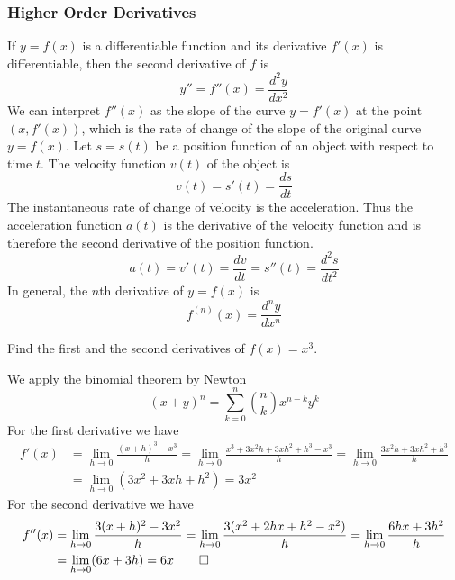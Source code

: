 \subsubsection{Higher Order Derivatives}
 If \(y=f(x)\) is a differentiable function and its derivative \(f'(x)\) is
 differentiable, then the second derivative of \(f\) is
\[y''=f''(x)=\frac{d^2y}{dx^2}\]
We can interpret \(f''(x)\) as the slope of the curve \(y=f'(x)\) at the point
\((x,f'(x))\), which is the rate of change of the slope of the original curve
\(y=f(x)\).
Let \(s=s(t)\) be a position function of an object with respect to time \(t\).
The velocity function \(v(t)\) of the object is \[v(t)=s'(t)=\frac{ds}{dt}\]
The instantaneous rate of change of velocity is the acceleration.
Thus the acceleration function \(a(t)\) is the derivative of the velocity
function and is therefore the second derivative of the position function.
\[a(t)=v'(t)=\frac{dv}{dt}=s''(t)=\frac{d^2s}{dt^2}\]
In general, the \(n\)th derivative of \(y=f(x)\) is
\[f^{(n)}(x)=\frac{d^ny}{dx^n}\]
\begin{problem}
    Find the first and the second derivatives of \(f(x)=x^3\).
\end{problem}
\begin{solution}
    We apply the binomial theorem by Newton
    \[(x+y)^n=\sum_{k=0}^n \binom{n}{k}x^{n-k}y^k\]
    For the first derivative we have
    \begin{align*}
        f'(x) &= \lim_{h\to 0}\frac{(x+h)^3-x^3}{h}=\lim_{h\to 0}
        \frac{x^3+3x^2h+3xh^2+h^3-x^3}{h}
        =\lim_{h\to 0}\frac{3x^2h+3xh^2+h^3}{h} \\
        &= \lim_{h\to 0}(3x^2+3xh+h^2)=3x^2
    \end{align*}
    For the second derivative we have
    \begin{align*}
        f''(x) &= \lim_{h\to 0}\frac{3(x+h)^2-3x^2}{h}
        =\lim_{h\to 0}\frac{3(x^2+2hx+h^2-x^2)}{h}
        =\lim_{h\to 0}\frac{6hx+3h^2}{h} \\
        &= \lim_{h\to 0}(6x+3h)=6x \qedhere
    \end{align*}
\end{solution}